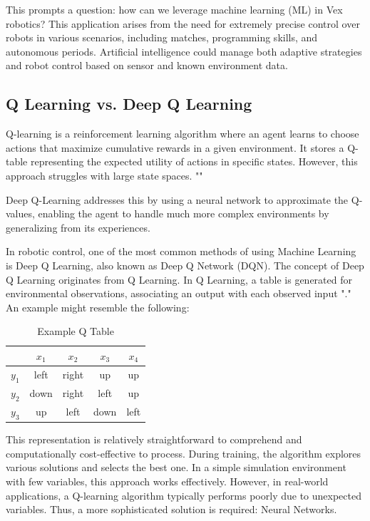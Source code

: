 This prompts a question: how can we leverage machine learning (ML) in Vex robotics? This application arises from the need for extremely precise control over robots in various scenarios, including matches, programming skills, and autonomous periods. Artificial intelligence could manage both adaptive strategies and robot control based on sensor and known environment data.

\subsection*{Q Learning vs. Deep Q Learning}
Q-learning is a reinforcement learning algorithm where an agent learns to choose actions that maximize cumulative rewards in a given environment. It stores a Q-table representing the expected utility of actions in specific states. However, this approach struggles with large state spaces. "\cite{sentdex_dqn}"

Deep Q-Learning addresses this by using a neural network to approximate the Q-values, enabling the agent to handle much more complex environments by generalizing from its experiences.

In robotic control, one of the most common methods of using Machine Learning is Deep Q Learning, also known as Deep Q Network (DQN). The concept of Deep Q Learning originates from Q Learning. In Q Learning, a table is generated for environmental observations, associating an output with each observed input "\cite{sentdex_dqn}." An example might resemble the following:

\begin{center}
    \begin{table}[!hbt]
        \centering
        \begin{tabular}{|c|c|c|c|c|}
             \hline
                & \(x_1\) & \(x_2\) & \(x_3\) & \(x_4\) \\ [0.5ex]
              \hline
              \(y_1\) & left & right & up & up\\
              \hline
              \(y_2\) & down & right & left & up \\
              \hline
              \(y_3\) & up & left & down & left\\ [1ex]
              \hline
        \end{tabular}
        \caption{Example Q Table}
        \label{tab:my_label}
    \end{table}
\end{center}

This representation is relatively straightforward to comprehend and computationally cost-effective to process. During training, the algorithm explores various solutions and selects the best one. In a simple simulation environment with few variables, this approach works effectively. However, in real-world applications, a Q-learning algorithm typically performs poorly due to unexpected variables. Thus, a more sophisticated solution is required: Neural Networks.

